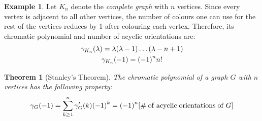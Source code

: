 \documentclass[svgnames]{article}
\newtheorem{Theorem}{Theorem}
\theoremstyle{definition}
\newtheorem*{Example*}{Example}
\theoremstyle{remark}
\theoremstyle{underline}
\theoremstyle{underline}
\begin{document}
	\begin{Example*}
		Let $K_n$ denote the \emph{complete graph} with $n$ vertices. Since every vertex is adjacent to all other vertices, the number of colours one can use for the rest of the vertices reduces by 1 after colouring each vertex. Therefore, its chromatic polynomial and number of acyclic orientations are:
		\begin{gather*}
			\gamma_{K_n}\pqty{\lambda} = \lambda\pqty{\lambda - 1}\dots\pqty{\lambda - n + 1} \\
			\gamma_{K_n}\pqty{-1} = \pqty{-1}^n n!
		\end{gather*} 
	\end{Example*}
	\begin{Theorem}[Stanley's Theorem]
		The chromatic polynomial of a graph $G$ with $n$ vertices has the following property:
		\begin{gather*}
			\gamma_{G}\pqty{-1} = \sum_{k \geq 1}^n \gamma'_G(k) \pqty{-1}^k = \pqty{-1}^n \bqty{\mathrm{\#\;of\;acyclic \;orientations\;of\;} G}
		\end{gather*}
	\end{Theorem}
\end{document}
